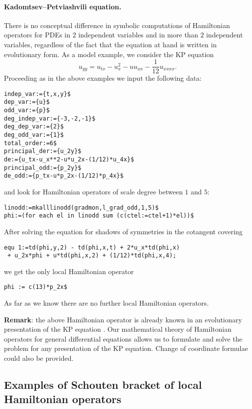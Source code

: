 \paragraph*{Kadomtsev--Petviashvili equation.}
\label{cdesec:mult-case}
There is no conceptual difference in symbolic computations of Hamiltonian
operators for PDEs in $2$ independent variables and in more than $2$
independent variables, regardless of the fact that the equation at hand is
written in evolutionary form. As a model example, we consider the KP equation
\begin{equation}
  \label{eq:3}
  u_{yy}=u_{tx}-u_x^2-uu_{xx}-\frac{1}{12}u_{xxxx}.
\end{equation}
Proceeding as in the above examples we input the following data:
\begin{verbatim}
indep_var:={t,x,y}$
dep_var:={u}$
odd_var:={p}$
deg_indep_var:={-3,-2,-1}$
deg_dep_var:={2}$
deg_odd_var:={1}$
total_order:=6$
principal_der:={u_2y}$
de:={u_tx-u_x**2-u*u_2x-(1/12)*u_4x}$
principal_odd:={p_2y}$
de_odd:={p_tx-u*p_2x-(1/12)*p_4x}$
\end{verbatim}
and look for Hamiltonian operators of scale degree between $1$ and $5$:
\begin{verbatim}
linodd:=mkalllinodd(gradmon,l_grad_odd,1,5)$
phi:=(for each el in linodd sum (c(ctel:=ctel+1)*el))$
\end{verbatim}
After solving the equation for shadows of symmetries in the cotangent covering
\begin{verbatim}
equ 1:=td(phi,y,2) - td(phi,x,t) + 2*u_x*td(phi,x)
 + u_2x*phi + u*td(phi,x,2) + (1/12)*td(phi,x,4);
\end{verbatim}
we get the only local Hamiltonian operator
\begin{verbatim}
phi := c(13)*p_2x$
\end{verbatim}
As far as we know there are no further local Hamiltonian operators.

\textbf{Remark}: the above Hamiltonian operator is already known in an
evolutionary presentation of the KP equation \cite{Kuperschmidt:94}. Our
mathematical theory of Hamiltonian operators for general differential equations
\cite{KerstenKrasilshchikVerbovetskyVitolo:HSGP} allows us to formulate and
solve the problem for any presentation of the KP equation. Change of coordinate
formulae could also be provided.


\subsection{Examples of Schouten bracket of local Hamiltonian
  operators}
\label{cdesec:scho-brack-local}

